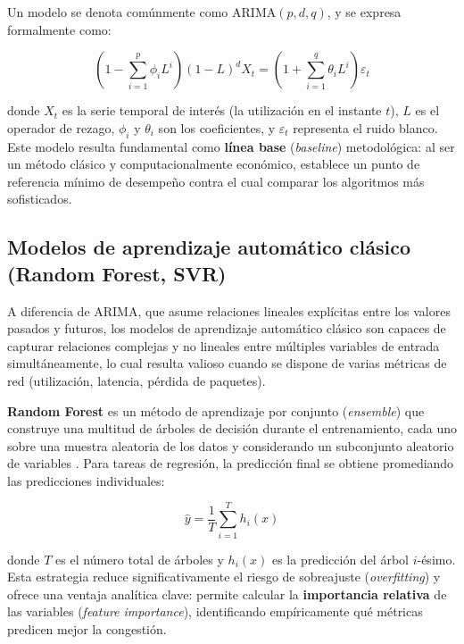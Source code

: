 \documentclass[12pt]{report}
\begin{document}
Un modelo se denota comúnmente como ARIMA$(p,d,q)$, y se expresa formalmente como:

\begin{equation}
    \left(1 - \sum_{i=1}^{p}\phi_i L^i\right)(1-L)^d X_t = \left(1 + \sum_{i=1}^{q}\theta_i L^i\right)\varepsilon_t
    \label{eq:arima}
\end{equation}

donde $X_t$ es la serie temporal de interés (la utilización en el instante $t$), $L$ es el operador de rezago, $\phi_i$ y $\theta_i$ son los coeficientes, y $\varepsilon_t$ representa el ruido blanco. Este modelo resulta fundamental como \textbf{línea base} (\textit{baseline}) metodológica: al ser un método clásico y computacionalmente económico, establece un punto de referencia mínimo de desempeño contra el cual comparar los 
algoritmos más sofisticados.

\subsection{Modelos de aprendizaje automático clásico (Random Forest, SVR)}
\label{subsec:ml_clasico}

A diferencia de ARIMA, que asume relaciones lineales explícitas entre los valores pasados y futuros, los modelos de aprendizaje automático clásico son capaces de capturar relaciones complejas y no lineales entre múltiples variables de entrada simultáneamente, lo cual resulta valioso cuando se dispone de varias métricas de red (utilización, latencia, pérdida de paquetes).

\textbf{Random Forest} es un método de aprendizaje por conjunto (\textit{ensemble}) que construye una multitud de árboles de decisión durante el entrenamiento, cada uno sobre una muestra aleatoria de los datos y considerando un subconjunto aleatorio de variables \cite{breiman2001}. Para tareas de regresión, la predicción final se obtiene promediando las predicciones individuales:

\begin{equation}
    \hat{y} = \frac{1}{T}\sum_{i=1}^{T} h_i(x)
    \label{eq:random_forest}
\end{equation}

donde $T$ es el número total de árboles y $h_i(x)$ es la predicción del árbol $i$-ésimo. Esta estrategia reduce significativamente el riesgo de sobreajuste (\textit{overfitting}) y ofrece una ventaja analítica clave: permite calcular la \textbf{importancia relativa} de las variables (\textit{feature importance}), identificando empíricamente qué métricas predicen mejor la congestión.
\end{document}
